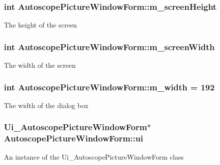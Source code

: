 \subsubsection[{\texorpdfstring{m\+\_\+screen\+Height}{m_screenHeight}}]{\setlength{\rightskip}{0pt plus 5cm}int Autoscope\+Picture\+Window\+Form\+::m\+\_\+screen\+Height\hspace{0.3cm}{\ttfamily [private]}}\hypertarget{class_autoscope_picture_window_form_a760dd289327d7731dd40dd9f3543588a}{}\label{class_autoscope_picture_window_form_a760dd289327d7731dd40dd9f3543588a}
The height of the screen 
\subsubsection[{\texorpdfstring{m\+\_\+screen\+Width}{m_screenWidth}}]{\setlength{\rightskip}{0pt plus 5cm}int Autoscope\+Picture\+Window\+Form\+::m\+\_\+screen\+Width\hspace{0.3cm}{\ttfamily [private]}}\hypertarget{class_autoscope_picture_window_form_a0bf8e1210cdea9fcf58b0153d52b7f6c}{}\label{class_autoscope_picture_window_form_a0bf8e1210cdea9fcf58b0153d52b7f6c}
The width of the screen 
\subsubsection[{\texorpdfstring{m\+\_\+width}{m_width}}]{\setlength{\rightskip}{0pt plus 5cm}int Autoscope\+Picture\+Window\+Form\+::m\+\_\+width = 192\hspace{0.3cm}{\ttfamily [private]}}\hypertarget{class_autoscope_picture_window_form_aa5dacd6f9d13d4cafa98edae38d161f5}{}\label{class_autoscope_picture_window_form_aa5dacd6f9d13d4cafa98edae38d161f5}
The width of the dialog box 
\subsubsection[{\texorpdfstring{ui}{ui}}]{\setlength{\rightskip}{0pt plus 5cm}Ui\+\_\+\+Autoscope\+Picture\+Window\+Form$\ast$ Autoscope\+Picture\+Window\+Form\+::ui\hspace{0.3cm}{\ttfamily [private]}}\hypertarget{class_autoscope_picture_window_form_aac9815d1313c1814ff9f0eefa4eeb47d}{}\label{class_autoscope_picture_window_form_aac9815d1313c1814ff9f0eefa4eeb47d}
An instance of the Ui\+\_\+\+Autoscope\+Picture\+Window\+Form class 

